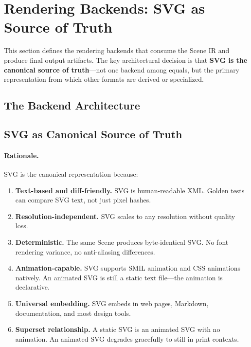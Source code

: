 \section{Rendering Backends: SVG as Source of Truth}
\label{sec:backends}

This section defines the rendering backends that consume the Scene IR and produce final output artifacts. The key architectural decision is that \textbf{SVG is the canonical source of truth}---not one backend among equals, but the primary representation from which other formats are derived or specialized.

\subsection{The Backend Architecture}


\subsection{SVG as Canonical Source of Truth}

\paragraph{Rationale.}
SVG is the canonical representation because:

\begin{enumerate}
  \item \textbf{Text-based and diff-friendly.} SVG is human-readable XML. Golden tests can compare SVG text, not just pixel hashes.
  
  \item \textbf{Resolution-independent.} SVG scales to any resolution without quality loss.
  
  \item \textbf{Deterministic.} The same Scene produces byte-identical SVG. No font rendering variance, no anti-aliasing differences.
  
  \item \textbf{Animation-capable.} SVG supports SMIL animation and CSS animations natively. An animated SVG is still a static text file---the animation is declarative.
  
  \item \textbf{Universal embedding.} SVG embeds in web pages, Markdown, documentation, and most design tools.
  
  \item \textbf{Superset relationship.} A static SVG is an animated SVG with no animation. An animated SVG degrades gracefully to still in print contexts.
\end{enumerate}

